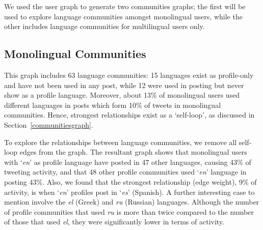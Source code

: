 \documentclass{llncs}
\begin{document}
We used the user graph to generate two communities graphs; the first
will be used to explore language communities amongst monolingual
users, while the other includes language communities for multilingual
users only.


\subsection{Monolingual Communities}

This graph includes 63 language communities: 15 languages exist as
profile-only and have not been used in any post, while 12 were used in
posting but never show as a profile language. Moreover, about 13\% of
monolingual users used different languages in posts which form 10\% of
tweets in monolingual communities. Hence, strongest relationships
exist as a `self-loop', as discussed in
Section~\ref{communitiesgraph}.

To explore the relationships between language communities, we remove
all self-loop edges from the graph. The resultant graph shows that
monolingual users with `{\emph{en}}' as profile language have posted
in 47 other languages, causing 43\% of tweeting activity, and that 48
other profile communities used `{\emph{en}}' language in posting
43\%. Also, we found that the strongest relationship (edge weight),
9\% of activity, is when `{\emph{en}}' profiles post in `{\emph{es}}'
(Spanish). A further interesting case to mention involve the \emph{el}
(Greek) and \emph{ru} (Russian) languages. Although the number of
profile communities that used \emph{ru} is more than twice compared to
the number of those that used \emph{el}, they were significantly lower
in terms of activity.

\end{document}
